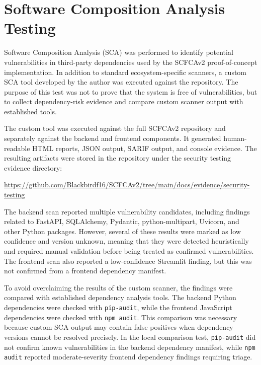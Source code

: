 \documentclass[12pt,a4paper]{report}
\begin{document}
\section{Software Composition Analysis Testing}

Software Composition Analysis (SCA) was performed to identify potential vulnerabilities in third-party dependencies used by the SCFCAv2 proof-of-concept implementation. In addition to standard ecosystem-specific scanners, a custom SCA tool \cite{scatool} developed by the author was executed against the repository. The purpose of this test was not to prove that the system is free of vulnerabilities, but to collect dependency-risk evidence and compare custom scanner output with established tools.

The custom tool was executed against the full SCFCAv2 repository and separately against the backend and frontend components. It generated human-readable HTML reports, JSON output, SARIF output, and console evidence. The resulting artifacts were stored in the repository under the security testing evidence directory:

\begin{center}
\url{https://github.com/Blackbirdf16/SCFCAv2/tree/main/docs/evidence/security-testing}
\end{center}

The backend scan reported multiple vulnerability candidates, including findings related to FastAPI, SQLAlchemy, Pydantic, python-multipart, Uvicorn, and other Python packages. However, several of these results were marked as low confidence and version unknown, meaning that they were detected heuristically and required manual validation before being treated as confirmed vulnerabilities. The frontend scan also reported a low-confidence Streamlit finding, but this was not confirmed from a frontend dependency manifest.

To avoid overclaiming the results of the custom scanner, the findings were compared with established dependency analysis tools. The backend Python dependencies were checked with \texttt{pip-audit}, while the frontend JavaScript dependencies were checked with \texttt{npm audit}. This comparison was necessary because custom SCA output may contain false positives when dependency versions cannot be resolved precisely. In the local comparison test, \texttt{pip-audit} did not confirm known vulnerabilities in the backend dependency manifest, while \texttt{npm audit} reported moderate-severity frontend dependency findings requiring triage.
\end{document}
